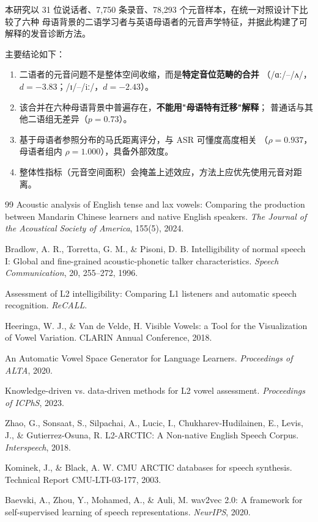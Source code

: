 \documentclass[11pt,a4paper]{ctexart}
\newcommand{\ipa}[1]{/#1/}
\begin{document}
本研究以 31 位说话者、7{,}750 条录音、78{,}293 个元音样本，在统一对照设计下比较了六种
母语背景的二语学习者与英语母语者的元音声学特征，并据此构建了可解释的发音诊断方法。

主要结论如下：

\begin{enumerate}[leftmargin=2em,itemsep=2pt]
  \item 二语者的元音问题不是整体空间收缩，而是\textbf{特定音位范畴的合并}
        （\ipa{ɑː}–\ipa{ʌ}，$d=-3.83$；\ipa{ɪ}–\ipa{iː}，$d=-2.43$）。
  \item 该合并在六种母语背景中普遍存在，\textbf{不能用"母语特有迁移"解释}；
        普通话与其他二语组无差异（$p=0.73$）。
  \item 基于母语者参照分布的马氏距离评分，与 ASR 可懂度高度相关
        （$\rho=0.937$，母语者组内 $\rho=1.000$），具备外部效度。
  \item 整体性指标（元音空间面积）会掩盖上述效应，方法上应优先使用元音对距离。
\end{enumerate}

\begin{thebibliography}{99}
 Acoustic analysis of English tense and lax vowels: Comparing the
production between Mandarin Chinese learners and native English speakers.
\textit{The Journal of the Acoustical Society of America}, 155(5), 2024.

 Bradlow, A. R., Torretta, G. M., \& Pisoni, D. B.
Intelligibility of normal speech I: Global and fine-grained acoustic-phonetic talker
characteristics. \textit{Speech Communication}, 20, 255--272, 1996.

 Assessment of L2 intelligibility: Comparing L1 listeners and automatic
speech recognition. \textit{ReCALL}.

 Heeringa, W. J., \& Van de Velde, H. Visible Vowels: a Tool for
the Visualization of Vowel Variation. CLARIN Annual Conference, 2018.

 An Automatic Vowel Space Generator for Language Learners.
\textit{Proceedings of ALTA}, 2020.

 Knowledge-driven vs. data-driven methods for L2 vowel assessment.
\textit{Proceedings of ICPhS}, 2023.

 Zhao, G., Sonsaat, S., Silpachai, A., Lucic, I., Chukharev-Hudilainen, E.,
Levis, J., \& Gutierrez-Osuna, R. L2-ARCTIC: A Non-native English Speech Corpus.
\textit{Interspeech}, 2018.

 Kominek, J., \& Black, A. W. CMU ARCTIC databases for speech synthesis.
Technical Report CMU-LTI-03-177, 2003.

 Baevski, A., Zhou, Y., Mohamed, A., \& Auli, M. wav2vec 2.0: A framework
for self-supervised learning of speech representations. \textit{NeurIPS}, 2020.
\end{thebibliography}
\end{document}
